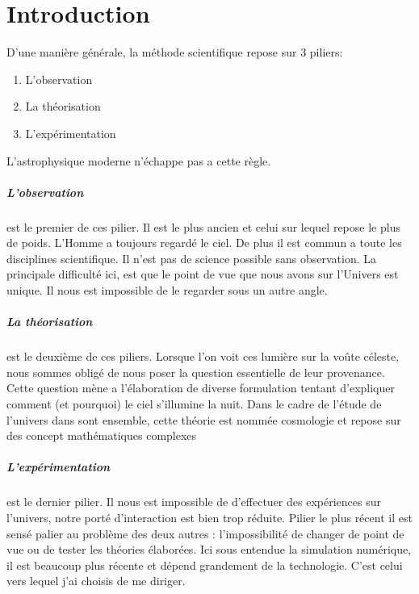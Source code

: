 \chapter{Introduction}


D'une manière générale, la méthode scientifique repose sur 3 piliers: 
\begin{enumerate}
\item L'observation
\item La théorisation
\item L'expérimentation
\end{enumerate}
L'astrophysique moderne n’échappe pas a cette règle.


\paragraph{L'observation} est le premier de ces pilier. 
Il est le plus ancien et celui sur lequel repose le plus de poids.
L'Homme a toujours regardé le ciel.
De plus il est commun a toute les disciplines scientifique.
Il n'est pas de science possible sans observation.
La principale difficulté ici, est que le point de vue que nous avons sur l'Univers est unique. 
Il nous est impossible de le regarder sous un autre angle.

\paragraph{La théorisation} est le deuxième de ces piliers.
Lorsque l'on voit ces lumière sur la voûte céleste, nous sommes obligé de nous poser la question essentielle de leur provenance.
Cette question mène a l'élaboration de diverse formulation tentant d'expliquer comment (et pourquoi) le ciel s'illumine la nuit.  
Dans le cadre de l'étude de l'univers dans sont ensemble, cette théorie est nommée cosmologie et repose sur des concept mathématiques complexes


\paragraph{L'expérimentation} est le dernier pilier.
Il nous est impossible de d'effectuer des expériences sur l'univers, notre porté d'interaction est bien trop réduite.
Pilier le plus récent il est sensé palier au problème des deux autres : l'impossibilité de changer de point de vue ou de tester les théories élaborées.
Ici sous entendue la simulation numérique, il est beaucoup plus récente et dépend grandement de la technologie.
C'est celui vers lequel j'ai choisis de me diriger.





